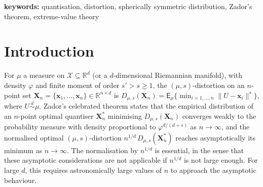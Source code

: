 \documentclass{article}
\newcommand{\AZ}{\textcolor{blue}}
\def\RR{\mathds{R}}
\def\SX{{\mathscr X}}
\def\xb{\mathbf{x}}
\def\Xb{\mathbf{X}}
\def\Ex{\mathsf{E}}
\def\simd{\stackrel{d}{\sim}}
\begin{document}
{\bf keywords:} quantisation, distortion, spherically symmetric distribution, Zador's theorem, extreme-value theory






\section{Introduction}
\label{sec:intr}

For $\mu$ a measure on $\SX\subseteq\RR^d$ (or a $d$-dimensional Riemannian manifold),
with density $\varphi$ and finite moment of order $s'>s\geq 1$, the $(\mu,s)$-distortion on an $n$-point set $\Xb_n=\{\xb_1,\ldots,\xb_n\}\in\RR^{n\times d}$ is $D_{\mu,s}(\Xb_n)=\Ex_\mu\{ \min_{i=1,\ldots,n} \|U-\xb_i\|^s \}$, where $U\simd\mu$. Zador's celebrated theorem \cite{Zador82} states that the empirical distribution of an $n$-point optimal quantiser $\Xb_n^*$ minimising $D_{\mu,s}(\Xb_n)$ converges weakly to the probability measure with density proportional to $\varphi^{d/(d+s)}$ as $n\to\infty$, and the normalised optimal $(\mu,s)$-distortion $n^{1/d}\,D_{\mu,s}(\Xb_n^*)$ reaches asymptotically its minimum as $n\to\infty$. The normalisation by $n^{1/d}$ is essential, in the sense that these asymptotic considerations are not applicable if $n^{1/d}$  is not large enough. For large $d$, this requires astronomically large values of $n$ to approach the asymptotic behaviour.
\end{document}
